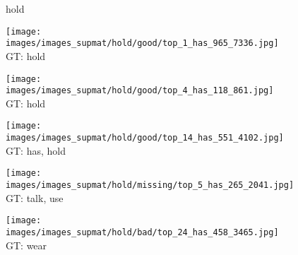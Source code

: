 \documentclass[10pt,twocolumn,letterpaper]{article}
\begin{document}
\begin{figure*}[t]
    
\begin{minipage}[t]{0.005\textwidth}
    	\centering
    	\vspace{-9.5ex}
    	\begin{turn}{90}
    	hold
    	\end{turn}
    	\vspace{2ex}
    \end{minipage}
    \hspace{0.01\textwidth}
\begin{minipage}[t]{0.18\textwidth}
    	\centering
       	\texttt{[image: images/images\_supmat/hold/good/top\_1\_has\_965\_7336.jpg]}\\
       	\vspace{0.3ex}
GT: hold
       	\vspace{2ex}
    \end{minipage}
    \hspace{0.005\textwidth}
\begin{minipage}[t]{0.18\textwidth}
    	\centering
       	\texttt{[image: images/images\_supmat/hold/good/top\_4\_has\_118\_861.jpg]}\\
       	\vspace{0.3ex}
GT: hold
       	\vspace{0.2ex}
    \end{minipage}
    \hspace{0.005\textwidth}
\begin{minipage}[t]{0.18\textwidth}
    	\centering
      	\texttt{[image: images/images\_supmat/hold/good/top\_14\_has\_551\_4102.jpg]}\\
      	\vspace{0.3ex}
GT: has, hold
       	\vspace{0.2ex}
    \end{minipage}
    \hspace{0.005\textwidth}
\begin{minipage}[t]{0.18\textwidth}
    	\centering
       	\texttt{[image: images/images\_supmat/hold/missing/top\_5\_has\_265\_2041.jpg]}\\
       	\vspace{0.3ex}
GT: talk, use
       	\vspace{0.2ex}
    \end{minipage}
    \hspace{0.005\textwidth}
\begin{minipage}[t]{0.18\textwidth}
    	\centering
       	\texttt{[image: images/images\_supmat/hold/bad/top\_24\_has\_458\_3465.jpg]} \\
       	\vspace{0.3ex}
GT: wear
       	\vspace{0.2ex}
    \end{minipage}
     	

\end{figure*}
\end{document}
